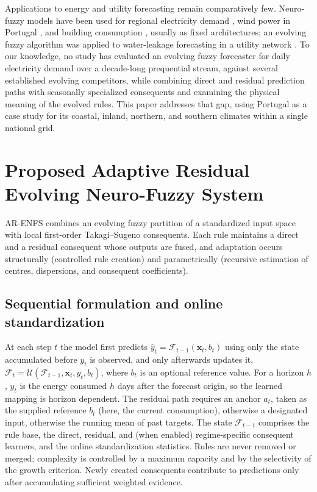 \documentclass[preprint,12pt]{elsarticle}
\begin{document}
Applications to energy and utility forecasting remain comparatively few. Neuro-fuzzy models have been used for regional electricity demand \citep{abraham2001neurofuzzy,ying2008anfis}, wind power in Portugal \citep{pousinho2011psoanfis}, and building consumption \citep{jozi2016hyfis,jozi2019office,silva2020ensemble}, usually as fixed architectures; an evolving fuzzy algorithm was applied to water-leakage forecasting in a utility network \citep{birek2014water}. To our knowledge, no study has evaluated an evolving fuzzy forecaster for daily electricity demand over a decade-long prequential stream, against several established evolving competitors, while combining direct and residual prediction paths with seasonally specialized consequents and examining the physical meaning of the evolved rules. This paper addresses that gap, using Portugal as a case study for its coastal, inland, northern, and southern climates within a single national grid.

\section{Proposed Adaptive Residual Evolving Neuro-Fuzzy System}
\label{sec:proposed_model}

AR-ENFS combines an evolving fuzzy partition of a standardized input space with local first-order Takagi--Sugeno consequents. Each rule maintains a direct and a residual consequent whose outputs are fused, and adaptation occurs structurally (controlled rule creation) and parametrically (recursive estimation of centres, dispersions, and consequent coefficients).

\subsection{Sequential formulation and online standardization}
\label{subsec:motivation_design}

At each step $t$ the model first predicts $\widehat{y}_t = \mathcal{F}_{t-1}(\mathbf{x}_t, b_t)$ using only the state accumulated before $y_t$ is observed, and only afterwards updates it, $\mathcal{F}_t = \mathcal{U}(\mathcal{F}_{t-1}, \mathbf{x}_t, y_t, b_t)$, where $b_t$ is an optional reference value. For a horizon $h$, $y_t$ is the energy consumed $h$ days after the forecast origin, so the learned mapping is horizon dependent. The residual path requires an anchor $a_t$, taken as the supplied reference $b_t$ (here, the current consumption), otherwise a designated input, otherwise the running mean of past targets. The state $\mathcal{F}_{t-1}$ comprises the rule base, the direct, residual, and (when enabled) regime-specific consequent learners, and the online standardization statistics. Rules are never removed or merged; complexity is controlled by a maximum capacity and by the selectivity of the growth criterion. Newly created consequents contribute to predictions only after accumulating sufficient weighted evidence.
\end{document}
